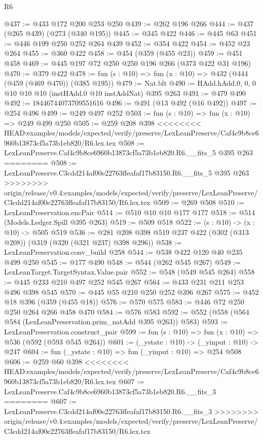 \begin{lexlean}{R6}
\begin{coremodule}
{{{{{{{{{{{{{{{@437 := @433 @172 @200 @253 @250
@439 := @262 @196 @266
@444 := @437 (@265 @439) (@273 (@340 @195))
@445 := @345 @422
@446 := @445 @63
@451 := @446 @199 @250 @252 @264 @439
@452 := @354 @422
@454 := @452 @23 @264
@455 := @360 @422
@458 := @454 (@359 (@455 @23))
@459 := @451 @458
@469 := @445 @197 @72 @250 @250 @196 @266 (@373 @422 @31 @196)
@470 := @379 @422
@478 := fun (s : @10) => fun (x : @10) => @432 (@444 (@459 (@469 @470)) (@385 @195))
@479 := Nat.blt
@490 := HAdd.hAdd.{0, 0, 0} @10 @10 @10 (instHAdd.{0} @10 instAddNat) @395 @263
@491 := @479 @490
@492 := 18446744073709551616
@496 := @491 (@13 @492 (@16 @492))
@497 := @254 @496
@499 := @249 @497 @252
@503 := fun (s : @10) => fun (x : @10) => @249 @499 @250
@505 := @259 @208 @398
<<<<<<<< HEAD:examples/models/expected/verify/preserve/LexLeanPreserve/Caf4c9b8ce6960b13873cf5a73b1eb820/R6.lex.tex
@508 := LexLeanPreserve.Caf4c9b8ce6960b13873cf5a73b1eb820.R6.__fits_5 @395 @263
========
@508 := LexLeanPreserve.C3cdd214af00e22763ffeafaf17b83150.R6.__fits_5 @395 @263
>>>>>>>> origin/release/v0.4:examples/models/expected/verify/preserve/LexLeanPreserve/C3cdd214af00e22763ffeafaf17b83150/R6.lex.tex
@509 := @269 @508
@510 := LexLeanPreservation.encPair
@514 := @510 @10 @10 @177 @177
@518 := @514 (Models.Ledger.Spill @395 @263)
@519 := @509 @518
@522 := (s : @10) -> (x : @10) -> @505 @519
@536 := @281 @208 @398 @519 @237 @422 (@302 (@313 @208)) (@319 (@320 (@321 @237) @398 @296))
@538 := LexLeanPreservation.conv_build @258
@544 := @538 @422 @120 @40 @235 @499 @250
@545 := @177 @490
@548 := @544 (@262 @545 @267)
@549 := LexLeanTarget.TargetSyntax.Value.pair
@552 := @548 (@549 @545 @264)
@558 := @445 @233 @210 @497 @252 @545 @267
@564 := @433 @231 @211 @253 @496 @398 @545
@570 := @445 @55 @210 @250 @252 @396 @267
@575 := @452 @18 @396 (@359 (@455 @18))
@576 := @570 @575
@583 := @446 @72 @250 @250 @264 @266 @458 @470
@584 := @576 @583
@592 := @552 (@558 (@564 @584 (LexLeanPreservation.prim_natAdd @395 @263)) @583)
@593 := LexLeanPreservation.construct_pair
@599 := fun (s : @10) => fun (x : @10) => @536 (@592 (@593 @545 @264))
@601 := (_ystate : @10) -> (_yinput : @10) -> @247
@604 := fun (_ystate : @10) => fun (_yinput : @10) => @254 @508
@606 := @259 @60 @398
<<<<<<<< HEAD:examples/models/expected/verify/preserve/LexLeanPreserve/Caf4c9b8ce6960b13873cf5a73b1eb820/R6.lex.tex
@607 := LexLeanPreserve.Caf4c9b8ce6960b13873cf5a73b1eb820.R6.__fits_3
========
@607 := LexLeanPreserve.C3cdd214af00e22763ffeafaf17b83150.R6.__fits_3
>>>>>>>> origin/release/v0.4:examples/models/expected/verify/preserve/LexLeanPreserve/C3cdd214af00e22763ffeafaf17b83150/R6.lex.tex
}}}}}}}}}}}}}}}
\end{coremodule}
\end{lexlean}
